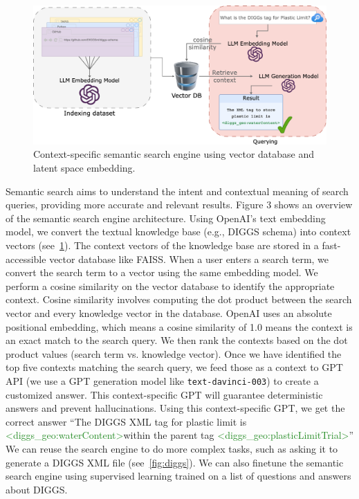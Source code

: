 \documentclass{article}
\begin{document}
\begin{figure}[ht]
    \centering
    \includegraphics[width = 0.8\linewidth]{figs/semantic-search.png}
    \caption{Context-specific semantic search engine using vector database and latent space embedding.
    \label{fig:semantic-search}
}
\end{figure}
Semantic search aims to understand the intent and contextual meaning of search queries, providing more accurate and relevant results. Figure 3 shows an overview of the semantic search engine architecture. Using OpenAI's text embedding model, we convert the textual knowledge base (e.g., DIGGS schema) into context vectors (see~\cref{fig:semantic-search}). The context vectors of the knowledge base are stored in a fast-accessible vector database like FAISS. When a user enters a search term, we convert the search term to a vector using the same embedding model. We perform a cosine similarity on the vector database to identify the appropriate context. Cosine similarity involves computing the dot product between the search vector and every knowledge vector in the database. OpenAI uses an absolute positional embedding, which means a cosine similarity of 1.0 means the context is an exact match to the search query. We then rank the contexts based on the dot product values (search term vs. knowledge vector). Once we have identified the top five contexts matching the search query, we feed those as a context to GPT API (we use a GPT generation model like \verb|text-davinci-003|) to create a customized answer. This context-specific GPT will guarantee deterministic answers and prevent hallucinations. Using this context-specific GPT, we get the correct answer ``The DIGGS XML tag for plastic limit is \textcolor{ForestGreen}{\textless diggs\_geo:waterContent\textgreater}within the parent tag \textcolor{ForestGreen}{\textless diggs\_geo:plasticLimitTrial\textgreater}” We can reuse the search engine to do more complex tasks, such as asking it to generate a DIGGS XML file (see~\cref{fig:diggs}). We can also finetune the semantic search engine using supervised learning trained on a list of questions and answers about DIGGS. 
\end{document}
